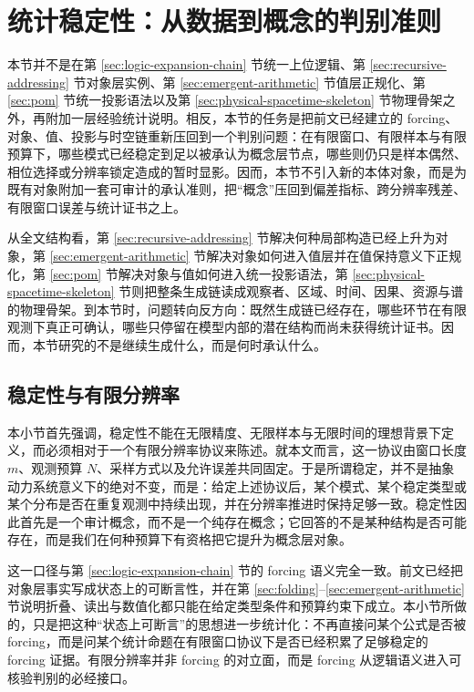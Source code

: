 \section{统计稳定性：从数据到概念的判别准则}\label{sec:statistical-stability}

本节并不是在第 \ref{sec:logic-expansion-chain} 节统一上位逻辑、第 \ref{sec:recursive-addressing} 节对象层实例、第 \ref{sec:emergent-arithmetic} 节值层正规化、第 \ref{sec:pom} 节统一投影语法以及第 \ref{sec:physical-spacetime-skeleton} 节物理骨架之外，再附加一层经验统计说明。相反，本节的任务是把前文已经建立的 forcing、对象、值、投影与时空链重新压回到一个判别问题：在有限窗口、有限样本与有限预算下，哪些模式已经稳定到足以被承认为概念层节点，哪些则仍只是样本偶然、相位选择或分辨率锁定造成的暂时显影。因而，本节不引入新的本体对象，而是为既有对象附加一套可审计的承认准则，把“概念”压回到偏差指标、跨分辨率残差、有限窗口误差与统计证书之上。

从全文结构看，第 \ref{sec:recursive-addressing} 节解决何种局部构造已经上升为对象，第 \ref{sec:emergent-arithmetic} 节解决对象如何进入值层并在值保持意义下正规化，第 \ref{sec:pom} 节解决对象与值如何进入统一投影语法，第 \ref{sec:physical-spacetime-skeleton} 节则把整条生成链读成观察者、区域、时间、因果、资源与谱的物理骨架。到本节时，问题转向反方向：既然生成链已经存在，哪些环节在有限观测下真正可确认，哪些只停留在模型内部的潜在结构而尚未获得统计证书。因而，本节研究的不是继续生成什么，而是何时承认什么。

\subsection{稳定性与有限分辨率}

本小节首先强调，稳定性不能在无限精度、无限样本与无限时间的理想背景下定义，而必须相对于一个有限分辨率协议来陈述。就本文而言，这一协议由窗口长度 \(m\)、观测预算 \(N\)、采样方式以及允许误差共同固定。于是所谓稳定，并不是抽象动力系统意义下的绝对不变，而是：给定上述协议后，某个模式、某个稳定类型或某个分布是否在重复观测中持续出现，并在分辨率推进时保持足够一致。稳定性因此首先是一个审计概念，而不是一个纯存在概念；它回答的不是某种结构是否可能存在，而是我们在何种预算下有资格把它提升为概念层对象。

这一口径与第 \ref{sec:logic-expansion-chain} 节的 forcing 语义完全一致。前文已经把对象层事实写成状态上的可断言性，并在第 \ref{sec:folding}--\ref{sec:emergent-arithmetic} 节说明折叠、读出与数值化都只能在给定类型条件和预算约束下成立。本小节所做的，只是把这种“状态上可断言”的思想进一步统计化：不再直接问某个公式是否被 forcing，而是问某个统计命题在有限窗口协议下是否已经积累了足够稳定的 forcing 证据。有限分辨率并非 forcing 的对立面，而是 forcing 从逻辑语义进入可核验判别的必经接口。

